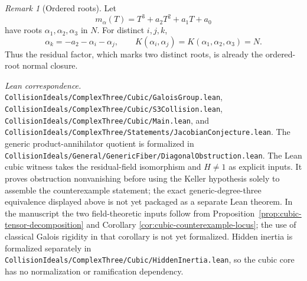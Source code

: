 \documentclass[11pt]{article}
\theoremstyle{remark}
\newtheorem*{remark}{Remark}
\theoremstyle{definition}
\newcommand{\leanpath}[1]{\texttt{\nolinkurl{#1}}}
\newenvironment{leanfiles}
  {\par\medskip\begingroup\footnotesize\raggedright\noindent
   \textit{Lean correspondence.}\ }
  {\par\endgroup\medskip}
\begin{document}
\begin{remark}[Ordered roots]
Let
\[
  m_\alpha(T)=T^3+a_2T^2+a_1T+a_0
\]
have roots \(\alpha_1,\alpha_2,\alpha_3\) in \(N\).  For distinct
\(i,j,k\),
\[
  \alpha_k=-a_2-\alpha_i-\alpha_j,
  \qquad
  K(\alpha_i,\alpha_j)
  =
  K(\alpha_1,\alpha_2,\alpha_3)
  =
  N.
\]
Thus the residual factor, which marks two distinct roots, is already
the ordered-root normal closure.
\end{remark}

\begin{leanfiles}
\leanpath{CollisionIdeals/ComplexThree/Cubic/GaloisGroup.lean},
\leanpath{CollisionIdeals/ComplexThree/Cubic/S3Collision.lean},
\leanpath{CollisionIdeals/ComplexThree/Cubic/Main.lean}, and
\leanpath{CollisionIdeals/ComplexThree/Statements/JacobianConjecture.lean}.  The
generic product-annihilator quotient is formalized in
\leanpath{CollisionIdeals/General/GenericFiber/DiagonalObstruction.lean}.  The
Lean cubic witness takes the residual-field isomorphism and
\(H\neq1\) as explicit inputs.  It proves obstruction nonvanishing before
using the Keller hypothesis solely to assemble the counterexample
statement; the exact generic-degree-three equivalence displayed above is
not yet packaged as a separate Lean theorem.  In the manuscript the two
field-theoretic inputs follow from
Proposition~\ref{prop:cubic-tensor-decomposition} and Corollary
\ref{cor:cubic-counterexample-locus}; the use of classical Galois
rigidity in that corollary is not yet formalized.  Hidden inertia is formalized
separately in
\leanpath{CollisionIdeals/ComplexThree/Cubic/HiddenInertia.lean}, so the cubic
core has no normalization or ramification dependency.
\end{leanfiles}
\end{document}
